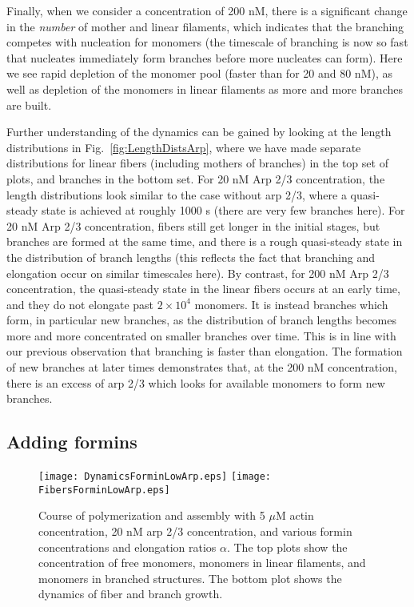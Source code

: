\documentclass[11pt]{article}
\begin{document}
Finally, when we consider a concentration of 200 nM, there is a significant change in the \emph{number} of mother and linear filaments, which indicates that the branching competes with nucleation for monomers (the timescale of branching is now so fast that nucleates immediately form branches before more nucleates can form). Here we see rapid depletion of the monomer pool (faster than for 20 and 80 nM), as well as depletion of the monomers in linear filaments as more and more branches are built. 

Further understanding of the dynamics can be gained by looking at the length distributions in Fig.\ \ref{fig:LengthDistsArp}, where we have made separate distributions for linear fibers (including mothers of branches) in the top set of plots, and branches in the bottom set. For 20 nM Arp 2/3 concentration, the length distributions look similar to the case without arp 2/3, where a quasi-steady state is achieved at roughly 1000 s (there are very few branches here). For 20 nM Arp 2/3 concentration, fibers still get longer in the initial stages, but branches are formed at the same time, and there is a rough quasi-steady state in the distribution of branch lengths (this reflects the fact that branching and elongation occur on similar timescales here). By contrast, for 200 nM Arp 2/3 concentration, the quasi-steady state in the linear fibers occurs at an early time, and they do not elongate past $2 \times 10^4$ monomers. It is instead branches which form, in particular new branches, as the distribution of branch lengths becomes more and more concentrated on smaller branches over time. This is in line with our previous observation that branching is faster than elongation. The formation of new branches at later times demonstrates that, at the 200 nM concentration, there is an excess of arp 2/3 which looks for available monomers to form new branches. 


\subsection{Adding formins}
\begin{figure}
\centering
\texttt{[image: DynamicsForminLowArp.eps]}
\texttt{[image: FibersForminLowArp.eps]}
\caption{\label{fig:ForminLowArp}Course of polymerization and assembly with 5 $\mu$M actin concentration, 20 nM arp 2/3 concentration, and various formin concentrations and elongation ratios $\alpha$. The top plots show the concentration of free monomers, monomers in linear filaments, and monomers in branched structures. The bottom plot shows the dynamics of fiber and branch growth. }
\end{figure}
\end{document}
